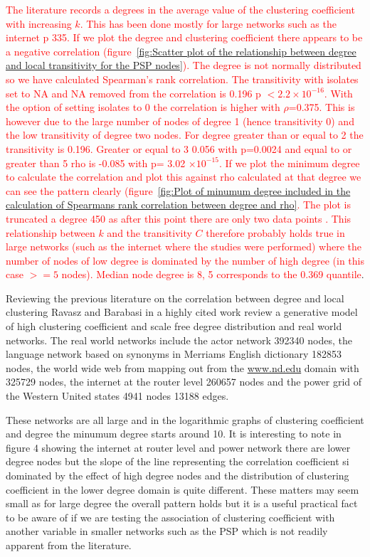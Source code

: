\textcolor{red}{The literature records a degrees in the average value of the clustering coefficient with increasing $k$. This has been done mostly for large networks such as the internet \cite{newman2018networks} p 335. If we plot the degree and clustering coefficient there appears to be a negative correlation (figure~\ref{fig:Scatter plot of the relationship between degree and local transitivity for the PSP nodes}). The degree is not normally distributed so we have calculated Spearman's rank correlation. The transitivity with isolates set to NA and NA removed from the correlation is 0.196 p $< 2.2 \times 10^{-16}$. With the option of setting isolates to 0 the correlation is higher with $\rho$=0.375. This is however due to the large number of nodes of degree 1 (hence transitivity 0) and the low transitivity of degree two nodes. For degree greater than or equal to 2 the transitivity is 0.196. Greater or equal to 3 0.056 with p=0.0024 and equal to or greater than 5 rho is -0.085 with p= 3.02 $\times 10^{-15}$. If we plot the minimum degree to calculate the correlation and plot
this against rho calculated at that degree we can see the pattern clearly (figure~\ref{fig:Plot of minumum degree included in the calculation of Spearmans rank correlation between degree and rho}. The plot is truncated a degree 450 as after this point there are only two data points .
This relationship between $k$ and the transitivity $C$ therefore probably holds true in large networks (such as the internet where the studies were performed) where the number of nodes of low degree is dominated by the number of high degree (in this case $>=5$ nodes). Median node degree is 8, 5 corresponds to the 0.369 quantile}.

Reviewing the previous literature on the correlation between degree and local clustering Ravasz and Barabasi in a highly cited work \cite{ravasz2002hierarchical} review a generative model of high clustering coefficient and scale free degree distribution and real world networks. The real world networks include the actor network 392340 nodes, the language network based on synonyms in Merriams English dictionary 182853 nodes, the world wide web from mapping out from the \url{www.nd.edu} domain with 325729 nodes, the internet at the router level 260657 nodes and the power grid of the Western United states 4941 nodes 13188 edges.

These networks are all large and in the logarithmic graphs of clustering coefficient and degree the minumum degree starts around 10. It is interesting to note in figure 4 showing the internet at router level and power network there are lower degree nodes but the slope of the line representing the correlation coefficient si dominated by the effect of high degree nodes and the distribution of clustering coefficient in the lower degree domain is quite different. These matters may seem small as for large degree the overall pattern holds but it is a useful practical fact to be aware of if we are testing the association of clustering coefficient with another variable in smaller networks such as the PSP which is not readily apparent from the literature.



